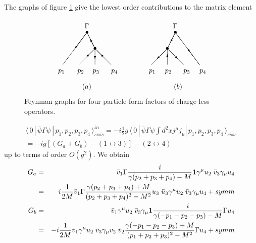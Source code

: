 \documentclass[a4paper,a4paper]{article}
\begin{document}
The graphs of figure \ref{f2} give the lowest order contributions to the
matrix element 
\begin{figure}[tbh]
\[
\unitlength4mm%
\begin{picture}(19,8.6)(0,-2)
\put(3,1){\line(1,1){2}} \put(4,2){\vector(1,1){.3}}
\put(5,1){\line(0,1){2}} \put(5,2){\vector(0,-1){.3}}
\put(5,3){\line(-1,2){1}} \put(5,3){\vector(-1,2){.6}}
\put(7,1){\line(-1,1){2}} \put(6,2){\vector(-1,1){.3}}
\put(5,3){\makebox(0,0){$\bullet$}}
\put(4,5){\makebox(0,0){$\bullet$}} \put(4,5){\line(-3,-4){3}}
\put(4,5){\vector(-3,-4){1.5}} \put(3.7,5.5){$\Gamma$}
\put(.4,0){$p_1$} \put(2.8,0){$p_2$} \put(3.4,-2){$(a)$}
\put(4.7,0){$p_3$} \put(7,0){$p_4$} \put(12,1){\line(1,1){2}}
\put(13,2){\vector(-1,-1){.3}} \put(14,1){\line(0,1){2}}
\put(14,2){\vector(0,1){.3}} \put(16,1){\line(-1,1){2}}
\put(15,2){\vector(1,-1){.3}} \put(14,3){\makebox(0,0){$\bullet$}}
\put(15,5){\makebox(0,0){$\bullet$}} \put(15,5){\line(-1,-2){1}}
\put(15,5){\vector(-1,-2){.6}} \put(18,1){\line(-3,4){3}}
\put(18,1){\vector(-3,4){1.5}} \put(14.7,5.5){$\Gamma$}
\put(11.7,0){$p_1$} \put(13.7,0){$p_2$} \put(14.8,-2){$(b)$}
\put(16,0){$p_3$} \put(18,0){$p_4$}
\end{picture}
\]
\caption{Feynman graphs for four-particle form factors of charge-less
operators.}
\label{f2}
\end{figure}
\begin{multline*}
\langle \,0\,|\,\overline{\psi }\Gamma \psi
\,|\,p_{1},p_{2},p_{3},p_{4}\,\rangle _{\bar{s}s\bar{s}s}^{in}=-i\tfrac{1}{2}%
g\,\langle \,0\,|\,\overline{\psi }\Gamma \psi \int d^{2}xj^{\mu }j_{\mu
}|\,p_{1},p_{2},p_{3},p_{4}\,\rangle _{\bar{s}s\bar{s}s} \\
=-ig\left[ \left( G_{a}+G_{b}\right) -\left( 1\leftrightarrow 3\right)
\right] -\left( 2\leftrightarrow 4\right)
\end{multline*}
up to terms of order $O(g^{2})$. We obtain 
\begin{eqnarray*}
G_{a} &=&\bar{v}_{1}\Gamma \frac{i}{\gamma (p_{2}+p_{3}+p_{4})-M}\mathbf{1}%
\gamma ^{\mu }u_{2}\;\bar{v}_{3}\gamma _{\mu }u_{4} \\
&=&i\frac{1}{2M}\bar{v}_{1}\Gamma \frac{\gamma (p_{2}+p_{3}+p_{4})+M}{%
(p_{2}+p_{3}+p_{4})^{2}-M^{2}}u_{3}\;\bar{u}_{3}\gamma ^{\mu }u_{2}\;\bar{v}%
_{3}\gamma _{\mu }u_{4}+symm \\
G_{b} &=&\bar{v}_{1}\gamma ^{\mu }u_{2}\;\bar{v}_{3}\gamma _{\mu }\mathbf{1}%
\frac{i}{\gamma (-p_{1}-p_{2}-p_{3})-M}\Gamma u_{4} \\
&=&-i\frac{1}{2M}\bar{v}_{1}\gamma ^{\mu }u_{2}\;\bar{v}_{3}\gamma _{\mu
}v_{2}\;\bar{v}_{2}\frac{\gamma (-p_{1}-p_{2}-p_{3})+M}{%
(p_{1}+p_{2}+p_{3})^{2}-M^{2}}\Gamma u_{4}+symm
\end{eqnarray*}
\end{document}
